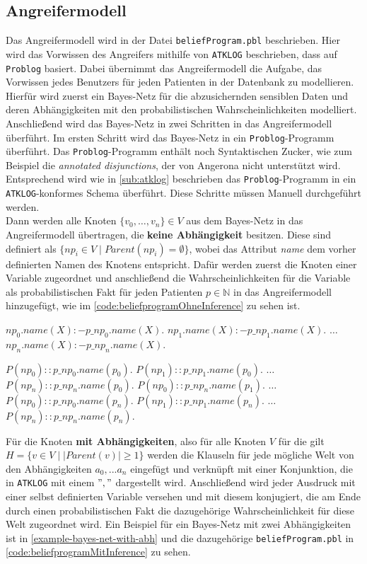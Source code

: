 \documentclass[german,version-2020-11]{uzl-thesis}
\begin{document}
\subsection{Angreifermodell} \label{2.2.1}
Das Angreifermodell wird in der Datei \texttt{beliefProgram.pbl} beschrieben. Hier wird das Vorwissen des Angreifers mithilfe von \texttt{ATKLOG} beschrieben, dass auf \texttt{Problog} basiert. Dabei übernimmt das Angreifermodell die Aufgabe, das Vorwissen jedes Benutzers für jeden Patienten in der Datenbank zu modellieren. \\ 
Hierfür wird zuerst ein Bayes-Netz für die abzusichernden sensiblen Daten und deren Abhängigkeiten mit den probabilistischen Wahrscheinlichkeiten modelliert. Anschließend wird das Bayes-Netz in zwei Schritten in das Angreifermodell überführt. Im ersten Schritt wird das Bayes-Netz in ein \texttt{Problog}-Programm überführt. Das \texttt{Problog}-Programm enthält noch Syntaktischen Zucker, wie zum Beispiel die \emph{annotated disjunctions}, der von Angerona nicht unterstützt wird. Entsprechend wird wie in \cref{sub:atklog} beschrieben das \texttt{Problog}-Programm  in ein \texttt{ATKLOG}-konformes Schema überführt. Diese Schritte müssen Manuell durchgeführt werden. \\   
Dann werden alle Knoten $\{v_0, \dots ,v_n\} \in V$ aus dem Bayes-Netz in das Angreifermodell übertragen, die \textbf{keine Abhängigkeit} besitzen. Diese sind definiert als $\{np_i \in V \mid Parent(np_i) = \emptyset\}$, wobei das Attribut \textit{name} dem vorher definierten Namen des Knotens entspricht. Dafür werden zuerst die Knoten einer Variable zugeordnet und anschließend die Wahrscheinlichkeiten für die Variable als probabilistischen Fakt für jeden Patienten $p \in \mathbb{N}$ in das Angreifermodell hinzugefügt, wie im \autoref{code:beliefprogramOhneInference} zu sehen ist.
\begin{Pseudocode} [caption={\texttt{beliefProgram.pbl} für Knoten ohne Abhängigkeiten}, label={code:beliefprogramOhneInference}]
$np_0.name(X) :- p\_np_0.name(X).$ 
$np_1.name(X) :- p\_np_1.name(X).$ 
$\dots$
$np_n.name(X) :- p\_np_n.name(X).$

$P(np_0) ::  p\_np_0.name(p_0).$ 
$P(np_1) ::  p\_np_1.name(p_0).$ 
$\dots$
$P(np_n) ::  p\_np_n.name(p_0).$ 
$P(np_0) ::  p\_np_n.name(p_1).$ 
$\dots$
$P(np_0) ::  p\_np_0.name(p_n).$ 
$P(np_1) ::  p\_np_1.name(p_n).$ 
$\dots$
$P(np_n) ::  p\_np_n.name(p_n).$ 
\end{Pseudocode}
Für die Knoten \textbf{mit Abhängigkeiten}, also für alle Knoten $V$ für die gilt $H=\{v \in V \mid \lvert Parent(v) \rvert \geq 1 \}$ werden die Klauseln für jede mögliche Welt von den Abhängigkeiten $a_0, ... a_n$ eingefügt und verknüpft mit einer Konjunktion, die in \texttt{ATKLOG} mit einem $","$ dargestellt wird. Anschließend wird jeder Ausdruck mit einer selbst definierten Variable versehen und mit diesem konjugiert, die am Ende durch einen probabilistischen Fakt die dazugehörige Wahrscheinlichkeit für diese Welt zugeordnet wird. Ein Beispiel für ein Bayes-Netz mit zwei Abhängigkeiten ist in \autoref{example-bayes-net-with-abh}  und die dazugehörige \texttt{beliefProgram.pbl} in \autoref{code:beliefprogramMitInference} zu sehen.
\end{document}
